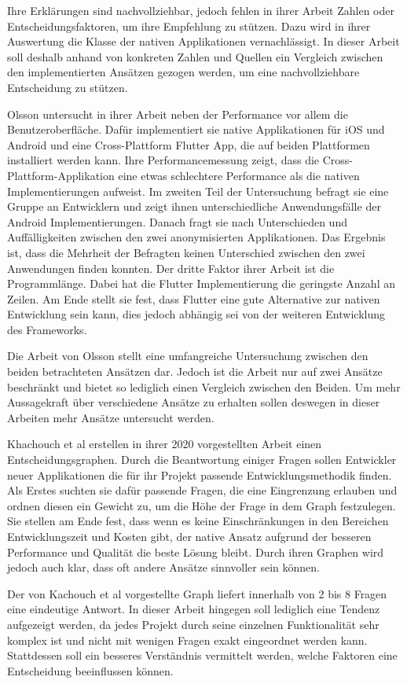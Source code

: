Ihre Erklärungen sind nachvollziehbar, jedoch fehlen in ihrer Arbeit Zahlen oder Entscheidungsfaktoren, um ihre Empfehlung zu stützen. Dazu wird in ihrer Auswertung die Klasse der nativen Applikationen vernachlässigt. In dieser Arbeit soll deshalb anhand von konkreten Zahlen und Quellen ein Vergleich zwischen den implementierten Ansätzen gezogen werden, um eine nachvollziehbare Entscheidung zu stützen.

Olsson \cite{Olsson_2020} untersucht in ihrer Arbeit neben der Performance vor allem die Benutzeroberfläche. Dafür implementiert sie native Applikationen für iOS und Android und eine Cross-Plattform Flutter App, die auf beiden Plattformen installiert werden kann. Ihre Performancemessung zeigt, dass die Cross-Plattform-Applikation eine etwas schlechtere Performance als die nativen Implementierungen aufweist. Im zweiten Teil der Untersuchung befragt sie eine Gruppe an Entwicklern und zeigt ihnen unterschiedliche Anwendungsfälle der Android Implementierungen. Danach fragt sie nach Unterschieden und Auffälligkeiten zwischen den zwei anonymisierten Applikationen. Das Ergebnis ist, dass die Mehrheit der Befragten keinen Unterschied zwischen den zwei Anwendungen finden konnten. Der dritte Faktor ihrer Arbeit ist die Programmlänge. Dabei hat die Flutter Implementierung die geringste Anzahl an Zeilen. Am Ende stellt sie fest, dass Flutter eine gute Alternative zur nativen Entwicklung sein kann, dies jedoch abhängig sei von der weiteren Entwicklung des Frameworks.

Die Arbeit von Olsson \cite{Olsson_2020} stellt eine umfangreiche Untersuchung zwischen den beiden betrachteten Ansätzen dar. Jedoch ist die Arbeit nur auf zwei Ansätze beschränkt und bietet so lediglich einen Vergleich zwischen den Beiden. Um mehr Aussagekraft über verschiedene Ansätze zu erhalten sollen deswegen in dieser Arbeiten mehr Ansätze untersucht werden. 

Khachouch et al \cite{IEEE_Khackouch_Al} erstellen in ihrer 2020 vorgestellten Arbeit einen Entscheidungsgraphen. Durch die Beantwortung einiger Fragen sollen Entwickler neuer Applikationen die für ihr Projekt passende Entwicklungsmethodik finden. Als Erstes suchten sie dafür passende Fragen, die eine Eingrenzung erlauben und ordnen diesen ein Gewicht zu, um die Höhe der Frage in dem Graph festzulegen. Sie stellen am Ende fest, dass wenn es keine Einschränkungen in den Bereichen Entwicklungszeit und Kosten gibt, der native Ansatz aufgrund der besseren Performance und Qualität die beste Lösung bleibt. Durch ihren Graphen wird jedoch auch klar, dass oft andere Ansätze sinnvoller sein können.

Der von Kachouch et al \cite{IEEE_Khackouch_Al} vorgestellte Graph liefert innerhalb von 2 bis 8 Fragen eine eindeutige Antwort. In dieser Arbeit hingegen soll lediglich eine Tendenz aufgezeigt werden, da jedes Projekt durch seine einzelnen Funktionalität sehr komplex ist und nicht mit wenigen Fragen exakt eingeordnet werden kann. Stattdessen soll ein besseres Verständnis vermittelt werden, welche Faktoren eine Entscheidung beeinflussen können. 